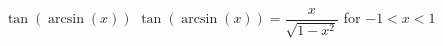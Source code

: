  {$\tan \left( \arcsin \left( x \right) \right)$ }
{ $\tan \left( \arcsin \left( x \right) \right) = \dfrac{x}{\sqrt{1 - x^{2}}}$  for $-1 < x < 1$}
